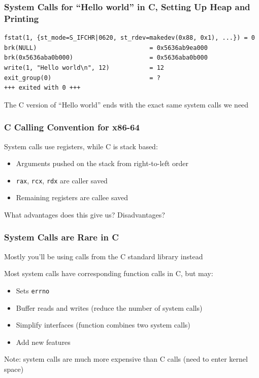 \documentclass[aspectratio=169]{beamer}
\begin{document}
  \begin{frame}[fragile]
    \frametitle{System Calls for ``Hello world'' in C, Setting Up Heap and
                Printing}

    \begin{lstlisting}[basicstyle=\ttfamily\footnotesize]
fstat(1, {st_mode=S_IFCHR|0620, st_rdev=makedev(0x88, 0x1), ...}) = 0
brk(NULL)                               = 0x5636ab9ea000
brk(0x5636aba0b000)                     = 0x5636aba0b000
write(1, "Hello world\n", 12)           = 12
exit_group(0)                           = ?
+++ exited with 0 +++
    \end{lstlisting}

    \vspace{1em}
    The C version of ``Hello world'' ends with the exact same system calls we
    need
  \end{frame}

  \begin{frame}
    \frametitle{C Calling Convention for x86-64}

    System calls use registers, while C is stack based:
    \begin{itemize}
      \item Arguments pushed on the stack from right-to-left order
      \item \texttt{rax}, \texttt{rcx}, \texttt{rdx} are caller saved
      \item Remaining registers are callee saved
    \end{itemize}

    \vspace{2em}
    What advantages does this give us? Disadvantages?
  \end{frame}

  \begin{frame}
    \frametitle{System Calls are Rare in C}

    Mostly you'll be using calls from the C standard library instead

    \vspace{1em}

    Most system calls have corresponding function calls in C, but may:
    \begin{itemize}
      \item Sets \texttt{errno}
      \item Buffer reads and writes (reduce the number of system calls)
      \item Simplify interfaces (function combines two system calls)
      \item Add new features
    \end{itemize}

    \vspace{1em}

    Note: system calls are much more expensive than C calls (need to enter
    kernel space)
  \end{frame}
\end{document}
